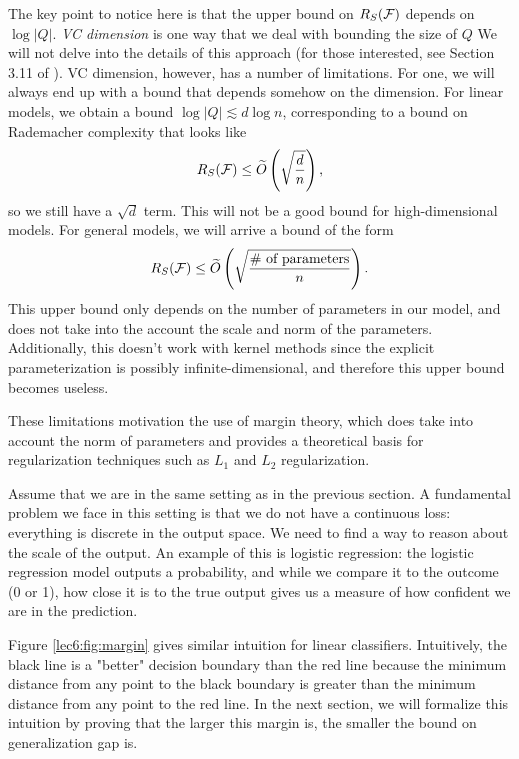 The key point to notice here is that the upper bound on $R_S(\mathcal F)$ depends on $\log |Q|$. \textit{VC dimension} is one way that we deal with bounding the size of $Q$ We will not delve into the details of this approach (for those interested, see Section 3.11 of \cite{percynotes}). VC dimension, however, has a number of limitations. For one, we will always end up with a bound that depends somehow on the dimension. For linear models, we obtain a bound $\log |Q| \lesssim d \log n$, corresponding to a bound on Rademacher complexity that looks like
\begin{equation}
    R_S(\mathcal F) \leq \widetilde{O} \left( \sqrt{\frac{d}{n}} \right),
\end{equation}
so we still have a $\sqrt{d}$ term. This will not be a good bound for high-dimensional models. For general models, we will arrive a bound of the form 
\begin{equation}
    R_S(\mathcal F) \leq \widetilde{O} \left( \sqrt{\frac{\text{\# of parameters}}{n}} \right).
\end{equation}
This upper bound only depends on the number of parameters in our model, and does not take into the account the scale and norm of the parameters. Additionally, this doesn't work with kernel methods since the explicit parameterization is possibly infinite-dimensional, and therefore this upper bound becomes useless.

These limitations motivation the use of margin theory, which does take into account the norm of parameters and provides a theoretical basis for regularization techniques such as $L_1$ and $L_2$ regularization.


Assume that we are in the same setting as in the previous section. A fundamental problem we face in this setting is that we do not have a continuous loss: everything is discrete in the output space. We need to find a way to reason about the scale of the output. An example of this is logistic regression: the logistic regression model outputs a probability, and while we compare it to the outcome (0 or 1), how close it is to the true output gives us a measure of how confident we are in the prediction.

Figure \ref{lec6:fig:margin} gives similar intuition for linear classifiers. Intuitively, the black line is a "better" decision boundary than the red line because the minimum distance from any point to the black boundary is greater than the minimum distance from any point to the red line. In the next section, we will formalize this intuition by proving that the larger this margin is, the smaller the bound on generalization gap is.

